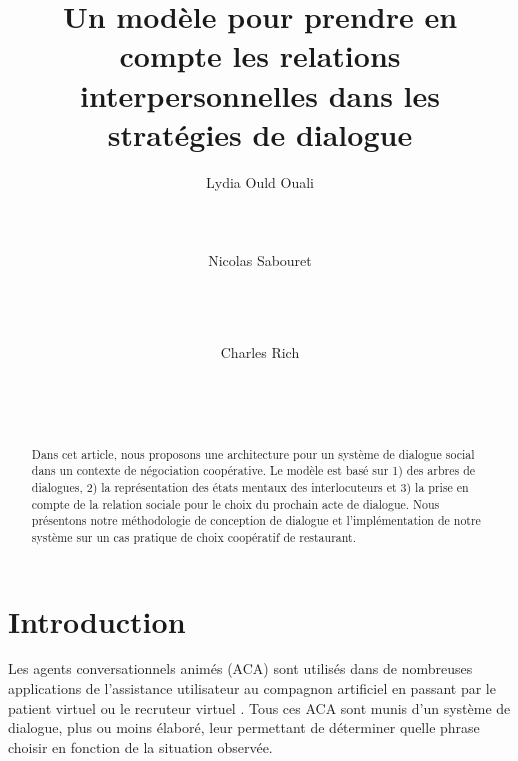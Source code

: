 \documentclass [french]{sig-alternate-05-2015}
\begin{document}
\title{Un modèle pour prendre en compte les relations interpersonnelles dans les stratégies de dialogue}



\author{
\alignauthor Lydia Ould Ouali\\
       \\
       \\
       \\
\alignauthor Nicolas Sabouret\\
       \\
       \\
       \\
        \and
\alignauthor Charles Rich\\
       \\
       \\
       \\
}


\maketitle
\begin{abstract}
\par Dans cet article, nous proposons une architecture pour un système de dialogue social dans un contexte de négociation coopérative. Le modèle est basé sur 1) des arbres de dialogues, 2) la représentation des états mentaux des interlocuteurs et 3) la prise en compte de la relation sociale pour le choix du prochain acte de dialogue. Nous présentons notre méthodologie de conception de dialogue et l'implémentation de notre système sur un cas pratique de choix coopératif de restaurant.
\end{abstract}



\section{Introduction}


Les agents conversationnels animés (ACA) sont utilisés dans de nombreuses applications de l'assistance utilisateur \cite{sidner2013always} au compagnon artificiel \cite{sidner2013always, riviere2014aca} en passant par le patient virtuel \cite{annesysteme} ou le recruteur virtuel \cite{jones2012affective}. Tous ces ACA sont munis d'un système de dialogue, plus ou moins élaboré, leur permettant de déterminer quelle phrase choisir en fonction de la situation observée.
\end{document}
